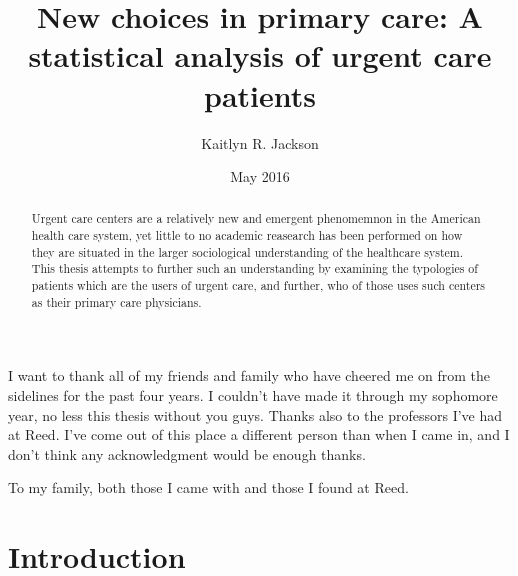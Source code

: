 \documentclass[12pt,twoside]{reedthesis}
\title{New choices in primary care: A statistical analysis of urgent care
patients}
\author{Kaitlyn R. Jackson}
\date{May 2016}
\begin{document}
      \maketitle
  
  \frontmatter %
  \pagestyle{empty} %

      \begin{acknowledgements}
      \doublespacing I want to thank all of my friends and family who have
      cheered me on from the sidelines for the past four years. I couldn't
      have made it through my sophomore year, no less this thesis without you
      guys. Thanks also to the professors I've had at Reed. I've come out of
      this place a different person than when I came in, and I don't think any
      acknowledgment would be enough thanks.
    \end{acknowledgements}
  
  

      \hypersetup{linkcolor=black}
    \setcounter{tocdepth}{1}
    \tableofcontents
  
      \listoftables
  
      \listoffigures
  
      \begin{abstract}
      \doublespacing Urgent care centers are a relatively new and emergent
      phenomemnon in the American health care system, yet little to no
      academic reasearch has been performed on how they are situated in the
      larger sociological understanding of the healthcare system. This thesis
      attempts to further such an understanding by examining the typologies of
      patients which are the users of urgent care, and further, who of those
      uses such centers as their primary care physicians.
    \end{abstract}
  
      \begin{dedication}
      To my family, both those I came with and those I found at Reed.
    \end{dedication}
  
  \mainmatter %
  \pagestyle{fancyplain} %

  \chapter{Introduction}\label{introduction}
  
\end{document}
